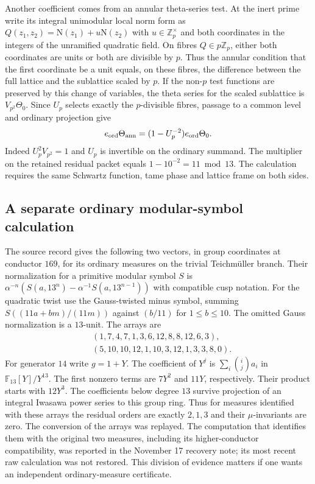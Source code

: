 \documentclass[11pt]{article}
\begin{document}
Another coefficient comes from an annular theta-series test. At the
inert prime write its integral unimodular local norm form as
$Q(z_1,z_2)=\mathrm N(z_1)+u\mathrm N(z_2)$ with $u\in\mathbb Z_p^\times$
and both coordinates in the integers of the unramified quadratic field.
On fibres $Q\in p\mathbb Z_p$, either both coordinates are units or
both are divisible by $p$. Thus the annular condition that the first
coordinate be a unit equals, on these fibres, the difference between
the full lattice and the sublattice scaled by $p$. If the non-$p$
test functions are preserved by this change of variables, the theta
series for the scaled sublattice is $V_{p^2}\Theta_0$. Since $U_p$
selects exactly the $p$-divisible fibres, passage to a common level
and ordinary projection give
\[
 e_{\rm ord}\Theta_{\rm ann}=(1-U_p^{-2})e_{\rm ord}\Theta_0.
\]
Indeed $U_p^2V_{p^2}=1$ and $U_p$ is invertible on the ordinary
summand. The multiplier on the retained residual packet equals
$1-10^{-2}=11\bmod13$. The calculation requires the same
Schwartz function, tame phase and lattice frame on both sides.

\subsection{A separate ordinary modular-symbol calculation}
The source record gives the following two vectors, in group coordinates
at conductor $169$, for its ordinary measures on the trivial Teichm\"uller
branch. Their normalization for a primitive modular symbol $S$ is
$\alpha^{-n}(S(a,13^n)-\alpha^{-1}S(a,13^{n-1}))$ with compatible
cusp notation. For the quadratic twist use the Gauss-twisted minus
symbol, summing $S((11a+bm)/(11m))$ against $(b/11)$ for $1\le b\le10$.
The omitted Gauss normalization is a $13$-unit. The arrays are
\[
\begin{split}
 &(1,7,4,7,1,3,6,12,8,8,12,6,3),\\
 &(5,10,10,12,1,10,3,12,1,3,3,8,0).
\end{split}
\]
For generator $14$ write $g=1+Y$. The coefficient of $Y^j$ is
$\sum_i\binom ij a_i$ in $\mathbb F_{13}[Y]/Y^{13}$. The first
nonzero terms are $7Y^2$ and $11Y$, respectively. Their product
starts with $12Y^3$. The coefficients below degree $13$ survive
projection of an integral Iwasawa power series to this group ring.
Thus for measures identified with these arrays the residual orders
are exactly $2,1,3$ and their $\mu$-invariants are zero. The
conversion of the arrays was replayed. The computation that identifies
them with the original two measures, including its higher-conductor
compatibility, was reported in the November 17 recovery note; its
most recent raw calculation was not restored. This division of evidence
matters if one wants an independent ordinary-measure certificate.
\end{document}
